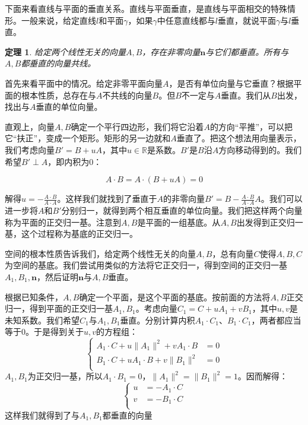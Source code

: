 \documentclass[12pt,UTF8]{ctexbook}
\newtheorem{tm}{定理}[section]
\begin{document}
下面来看直线与平面的垂直关系。直线与平面垂直，是直线与平面相交的特殊情形。一般来说，给定直线$l$和平面$\gamma$，如果$\gamma$中任意直线都与$l$垂直，就说平面$\gamma$与$l$垂直。
\begin{tm}
    给定两个线性无关的向量$A,B$，存在非零向量$\mathbf{n}$与它们都垂直。所有与$A,B$都垂直的向量共线。
\end{tm}
\begin{proof2}
首先来看平面中的情况。给定非零平面向量$A$，是否有单位向量与它垂直？根据平面的根本性质，总存在与$A$不共线的向量$B$。但$B$不一定与$A$垂直。我们从$B$出发，找出与$A$垂直的单位向量。

直观上，向量$A,B$确定一个平行四边形，我们将它沿着$A$的方向“平推”，可以把它“扶正”，变成一个矩形。矩形的另一边就和$A$垂直了。把这个想法用向量表示，我们考虑向量$B' = B + uA$，其中$u\in\mathbb{R}$是系数。$B'$是$B$沿$A$方向移动得到的。我们希望$B'\perp A$，即内积为$0$：

$$ A\cdot B = A\cdot (B + uA) = 0$$

解得$u = -\frac{A\cdot B}{A\cdot A}$。这样我们就找到了垂直于$A$的非零向量$B' = B -\frac{A\cdot B}{A\cdot A}A$。我们可以进一步将$A$和$B'$分别归一，就得到两个相互垂直的单位向量。我们把这样两个向量称为平面的正交归一基。注意到$A,B$是平面的一组基底。从$A,B$出发得到正交归一基，这个过程称为基底的正交归一。

空间的根本性质告诉我们，给定两个线性无关的向量$A,B$，总有向量$C$使得$A,B,C$为空间的基底。我们尝试用类似的方法将它正交归一，得到空间的正交归一基$A_1,B_1,\mathbf{n}$，然后证明$\mathbf{n}$与$A,B$垂直。

根据已知条件，$A,B$确定一个平面，是这个平面的基底。按前面的方法将$A,B$正交归一，得到平面的正交归一基$A_1,B_1$。考虑向量$C_1=C+uA_1+vB_1$，其中$u,v$是未知系数。我们希望$C_1$与$A_1,B_1$垂直。分别计算内积$A_1\cdot C_1$、$B_1\cdot C_1$，两者都应当等于$0$。于是得到关于$u,v$的方程组：
$$
\left\{
\begin{array}{cl}
A_1\cdot C + u\|A_1\|^2 + vA_1\cdot B &= 0 \\
B_1\cdot C + uA_1\cdot B + v\|B_1\|^2 &= 0 \\
\end{array}
\right.
$$
$A_1,B_1$为正交归一基，所以$A_1\cdot B_1 = 0$，$\|A_1\|^2 = \|B_1\|^2 = 1$。因而解得：
$$
\left\{
\begin{array}{cl}
u &= -A_1\cdot C \\
v &= -B_1\cdot C \\
\end{array}
\right.
$$
这样我们就得到了与$A_1,B_1$都垂直的向量


\end{proof2}
\end{document}
